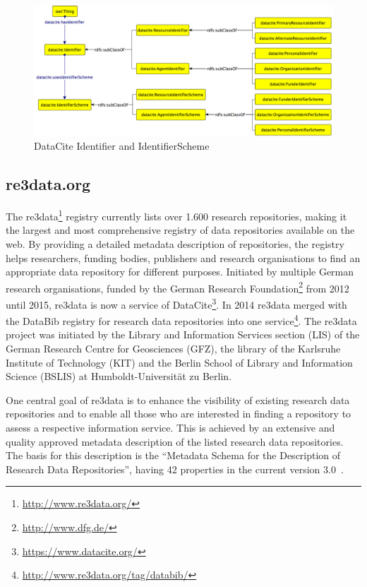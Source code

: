 \documentclass[a4paper,english,twoside,BCOR1.5cm,headsepline,DIV12,appendixprefix,final,12pt]{scrbook}
\newcommand\footnoteurl[1]{\footnote{\scriptsize\url{#1}}}
\begin{document}
\begin{figure}[!htbp]
\centering
  \includegraphics[width=\textwidth]{images/DataCiteIdentifiers.png}
  \caption{DataCite Identifier and IdentifierScheme}
  \label{fig:dcid}
\end{figure}

\subsection{re3data.org}
\label{sec:re3data}

The re3data\footnoteurl{http://www.re3data.org/} registry currently lists over 1.600 research repositories, making it the largest and most comprehensive registry of data repositories available on the web. By providing a detailed metadata description of repositories, the registry helps researchers, funding bodies, publishers and research organisations to find an appropriate data repository for different purposes\cite{PAMPLE2013}. Initiated by multiple German research organisations, funded by the German Research Foundation\footnoteurl{http://www.dfg.de/} from 2012 until 2015, re3data is now a service of DataCite\footnoteurl{https://www.datacite.org/}. 
In 2014 re3data merged with the DataBib registry for research data repositories into one service\footnoteurl{http://www.re3data.org/tag/databib/}. 
The re3data project was initiated by the Library and Information Services section (LIS) of the German Research Centre for Geosciences (GFZ), the library of the Karlsruhe Institute of Technology (KIT) and the Berlin School of Library and Information Science (BSLIS) at Humboldt-Universität zu Berlin.

One central goal of re3data is to enhance the visibility of existing research data repositories and to enable all those who are interested in finding a repository to assess a respective information service. This is achieved by an extensive and quality approved metadata description of the listed research data repositories. The basis for this description is the “Metadata Schema for the Description of Research Data Repositories”, having 42 properties in the current version 3.0~\cite{r3dSchema}.
\end{document}
